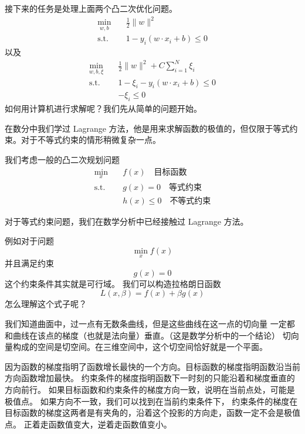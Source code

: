 接下来的任务是处理上面两个凸二次优化问题。
\begin{equation}
\begin{aligned}
\min_{w, b} \quad & \frac{1}{2} \|w\|^2 \\
\text{s.t.} \quad & 1-y_i \left(w\cdot x_i + b\right) \leqslant 0
\end{aligned}
\end{equation}
以及
\begin{equation}
\begin{aligned}
\min_{w,b,\xi}\quad & \frac12\|w\|^2 + C\sum_{i=1}^N \xi_i \\
\text{s.t.}\quad & 1-\xi_i-y_i(w\cdot x_i+b)\le0 \\
& -\xi_i\le0
\end{aligned}
\end{equation}
如何用计算机进行求解呢？我们先从简单的问题开始。

在数分中我们学过 Lagrange 方法，他是用来求解函数的极值的，但仅限于等式约束。对于不等式约束的情形稍微复杂一点。

我们考虑一般的凸二次规划问题
\begin{equation}
\begin{aligned}
\min_{x} \quad & f(x) \quad \text{目标函数} \\
\text{s.t.}\quad & g(x) =0 \quad \text{等式约束} \\
& h(x) \leqslant 0 \quad \text{不等式约束}
\end{aligned}
\end{equation}

对于等式约束问题，我们在数学分析中已经接触过 Lagrange 方法。

例如对于问题
\begin{equation}
\min_x f(x)
\end{equation}
并且满足约束
\begin{equation}
g(x)=0
\end{equation}
这个约束条件其实就是可行域。
我们可以构造拉格朗日函数
\begin{equation}
L(x,\beta)=f(x)+\beta g(x)
\end{equation}
怎么理解这个式子呢？

我们知道曲面中，过一点有无数条曲线，但是这些曲线在这一点的切向量
一定都和曲线在该点的梯度（也就是法向量）垂直。（这是数学分析中的一个结论）
切向量构成的空间是切空间。在三维空间中，这个切空间恰好就是一个平面。

因为函数的梯度指明了函数增长最快的一个方向。目标函数的梯度指明函数沿当前方向函数增加最快。
约束条件的梯度指明函数下一时刻的只能沿着和梯度垂直的方向前行。
如果目标函数和约束条件的梯度方向一致，说明在当前点处，可能是极值点。
如果方向不一致，我们可以找到在当前约束条件下，
约束条件的梯度在目标函数的梯度这两者是有夹角的，沿着这个投影的方向走，函数一定不会是极值点。
正着走函数值变大，逆着走函数值变小。


